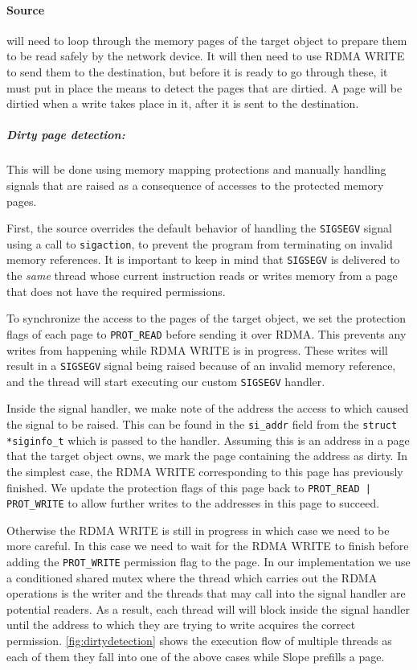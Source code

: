 \paragraph{Source} will need to loop through the memory pages of the target
object to prepare them to be read safely by the network device. It will then
need to use RDMA WRITE to send them to the destination, but before it is ready
to go through these, it must put in place the means to detect the pages that
are dirtied. A page will be dirtied when a write takes place in it, after
it is sent to the destination.

\subparagraph{Dirty page detection:}
This will be done using memory mapping protections and manually
handling signals that
are raised as a consequence of accesses to the protected memory pages.

First, the source overrides the default behavior of handling the
\texttt{SIGSEGV} signal using a call to
\texttt{sigaction}, to prevent the program from terminating on invalid memory
references. It is important to keep in mind that \texttt{SIGSEGV} is delivered
to the \emph{same} thread whose current instruction reads or writes memory
from a page that does not have the required permissions.

To synchronize the access to the pages of the target object,
we set the protection flags of each page to \texttt{PROT\_READ} before sending
it over RDMA. This prevents any writes from happening while RDMA WRITE
is in progress. These writes will result in a \texttt{SIGSEGV} signal being
raised because of an invalid memory reference, and the thread will start
executing our custom \texttt{SIGSEGV} handler.

Inside the signal handler, we make note of the address the access
to which caused the signal to be raised. This can be found in the
\texttt{si\_addr} field from the
\texttt{struct {*}siginfo\_t} which is passed to the handler.
Assuming this is an address in a
page that the target object owns, we mark the page containing the address as
dirty. In the simplest case, the RDMA WRITE corresponding to this page has
previously finished. We update the protection flags of this page back
to \texttt{PROT\_READ | PROT\_WRITE}
to allow further writes to the addresses in this page to succeed.

Otherwise the RDMA WRITE is still in progress in which case we need to be
more careful. In this case we need to wait for the
RDMA WRITE to finish before adding the \texttt{PROT\_WRITE} permission flag to
the page. In our
implementation we use a conditioned shared mutex where the thread which carries
out the RDMA operations is the writer and the threads that may call into the
signal handler are potential readers. As a result, each thread will will block
inside the signal handler until
the address to which they are trying to write acquires the correct permission.
\autoref{fig:dirtydetection} shows the execution flow of multiple threads
as each of them they fall into one of the above cases while Slope prefills a
page.

